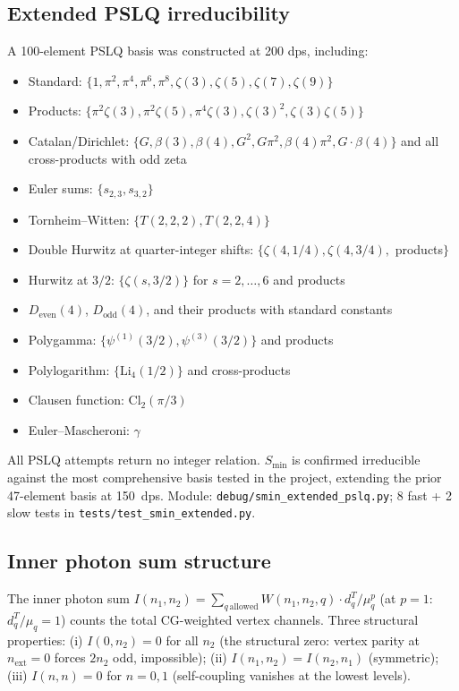 \documentclass[11pt]{article}
\begin{document}
\subsection{Extended PSLQ irreducibility}

A 100-element PSLQ basis was constructed at 200 dps, including:
\begin{itemize}
\item Standard: $\{1, \pi^2, \pi^4, \pi^6, \pi^8, \zeta(3), \zeta(5),
      \zeta(7), \zeta(9)\}$
\item Products: $\{\pi^2 \zeta(3), \pi^2 \zeta(5), \pi^4 \zeta(3),
      \zeta(3)^2, \zeta(3)\zeta(5)\}$
\item Catalan/Dirichlet: $\{G, \beta(3), \beta(4), G^2,
      G\pi^2, \beta(4)\pi^2, G \cdot \beta(4)\}$ and all
      cross-products with odd zeta
\item Euler sums: $\{s_{2,3}, s_{3,2}\}$
\item Tornheim--Witten: $\{T(2,2,2), T(2,2,4)\}$
\item Double Hurwitz at quarter-integer shifts:
      $\{\zeta(4,1/4), \zeta(4,3/4),$ products$\}$
\item Hurwitz at $3/2$: $\{\zeta(s, 3/2)\}$ for $s = 2, \ldots, 6$
      and products
\item $D_{\mathrm{even}}(4)$, $D_{\mathrm{odd}}(4)$, and their
      products with standard constants
\item Polygamma: $\{\psi^{(1)}(3/2), \psi^{(3)}(3/2)\}$ and products
\item Polylogarithm: $\{\mathrm{Li}_4(1/2)\}$ and cross-products
\item Clausen function: $\mathrm{Cl}_2(\pi/3)$
\item Euler--Mascheroni: $\gamma$
\end{itemize}

All PSLQ attempts return no integer relation.  $S_{\min}$ is confirmed
irreducible against the most comprehensive basis tested in the
project, extending the prior 47-element basis at 150~dps.  Module:
\texttt{debug/smin\_extended\_pslq.py}; 8 fast + 2 slow tests in
\texttt{tests/test\_smin\_extended.py}.

\subsection{Inner photon sum structure}

The inner photon sum $I(n_1, n_2) = \sum_{q\,\mathrm{allowed}}
W(n_1, n_2, q) \cdot d_q^T / \mu_q^p$ (at $p=1$: $d_q^T/\mu_q = 1$)
counts the total CG-weighted vertex channels.  Three structural
properties: (i) $I(0, n_2) = 0$ for all $n_2$ (the structural zero:
vertex parity at $n_{\mathrm{ext}}=0$ forces $2n_2$ odd, impossible);
(ii) $I(n_1, n_2) = I(n_2, n_1)$ (symmetric); (iii) $I(n, n) = 0$
for $n = 0, 1$ (self-coupling vanishes at the lowest levels).
\end{document}
